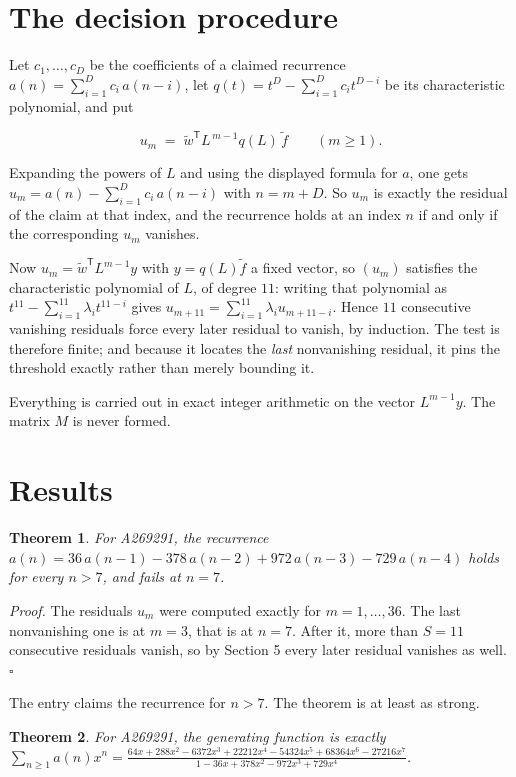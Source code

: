 \documentclass[11pt]{article}
\newtheorem{theorem}{Theorem}
\theoremstyle{definition}
\begin{document}
\section{The decision procedure}

Let $c_1,\dots,c_D$ be the coefficients of a claimed recurrence $a(n) = \sum_{i=1}^{D} c_i\,a(n-i)$, let $q(t) = t^{D} - \sum_{i=1}^{D} c_i t^{D-i}$ be its characteristic polynomial, and put

\[u_m \;=\; \tilde w^{\mathsf T} L^{\,m-1} q(L)\,\tilde f \qquad (m \ge 1).\]

Expanding the powers of $L$ and using the displayed formula for $a$, one gets $u_m = a(n) - \sum_{i=1}^{D} c_i\,a(n-i)$ with $n = m + D$. So $u_m$ is exactly the residual of the claim at that index, and the recurrence holds at an index $n$ if and only if the corresponding $u_m$ vanishes.

Now $u_m = \tilde w^{\mathsf T} L^{m-1} y$ with $y = q(L)\tilde f$ a fixed vector, so $(u_m)$ satisfies the characteristic polynomial of $L$, of degree $11$: writing that polynomial as $t^{11} - \sum_{i=1}^{11} \lambda_i t^{11-i}$ gives $u_{m+11} = \sum_{i=1}^{11} \lambda_i u_{m+11-i}$. Hence $11$ consecutive vanishing residuals force every later residual to vanish, by induction. The test is therefore finite; and because it locates the {\itshape last} nonvanishing residual, it pins the threshold exactly rather than merely bounding it.

Everything is carried out in exact integer arithmetic on the vector $L^{m-1}y$. The matrix $M$ is never formed.

\section{Results}

\begin{theorem} For A269291, the recurrence $a(n) = 36\,a(n-1) - 378\,a(n-2) + 972\,a(n-3) - 729\,a(n-4)$ holds for every $n > 7$, and fails at $n = 7$.\end{theorem}

{\itshape Proof.} The residuals $u_m$ were computed exactly for $m = 1,\dots,36$. The last nonvanishing one is at $m = 3$, that is at $n = 7$. After it, more than $S = 11$ consecutive residuals vanish, so by Section 5 every later residual vanishes as well. $\square$

The entry claims the recurrence for $n > 7$. The theorem is at least as strong.

\begin{theorem} For A269291, the generating function is exactly $\sum_{n\ge 1} a(n)x^n = \frac{64x + 288x^{2} - 6372x^{3} + 22212x^{4} - 54324x^{5} + 68364x^{6} - 27216x^{7}}{1 - 36x + 378x^{2} - 972x^{3} + 729x^{4}}$.\end{theorem}
\end{document}
